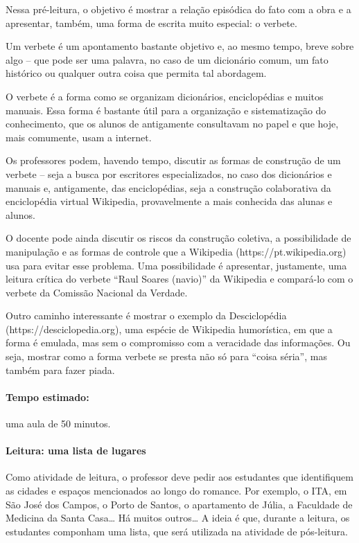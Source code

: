 \documentclass[12pt]{extarticle}
\begin{document}
Nessa pré-leitura, o objetivo é mostrar a relação episódica do fato com
a obra e a apresentar, também, uma forma de escrita muito especial: o
verbete.

Um verbete é um apontamento bastante objetivo e, ao mesmo tempo, breve
sobre algo -- que pode ser uma palavra, no caso de um dicionário comum,
um fato histórico ou qualquer outra coisa que permita tal abordagem.

O verbete é a forma como se organizam dicionários, enciclopédias e
muitos manuais. Essa forma é bastante útil para a organização e
sistematização do conhecimento, que os alunos de antigamente consultavam
no papel e que hoje, mais comumente, usam a internet.

Os professores podem, havendo tempo, discutir as formas de construção de
um verbete -- seja a busca por escritores especializados, no caso dos
dicionários e manuais e, antigamente, das enciclopédias, seja a
construção colaborativa da enciclopédia virtual Wikipedia, provavelmente
a mais conhecida das alunas e alunos.

O docente pode ainda discutir os riscos da construção coletiva, a
possibilidade de manipulação e as formas de controle que a Wikipedia
(https://pt.wikipedia.org) usa para evitar esse problema. Uma
possibilidade é apresentar, justamente, uma leitura crítica do verbete
``Raul Soares (navio)'' da Wikipedia e compará-lo com o verbete da
Comissão Nacional da Verdade.

Outro caminho interessante é mostrar o exemplo da Desciclopédia
(https://desciclopedia.org), uma espécie de Wikipedia humorística, em
que a forma é emulada, mas sem o compromisso com a veracidade das
informações. Ou seja, mostrar como a forma verbete se presta não só para
``coisa séria'', mas também para fazer piada.

\paragraph{Tempo estimado:} uma aula de 50 minutos.

\paragraph{Leitura: uma lista de lugares}

Como atividade de leitura, o professor deve pedir aos estudantes que
identifiquem as cidades e espaços mencionados ao longo do romance. Por
exemplo, o ITA, em São José dos Campos, o Porto de Santos, o apartamento
de Júlia, a Faculdade de Medicina da Santa Casa\ldots{} Há muitos
outros\ldots{} A ideia é que, durante a leitura, os estudantes componham
uma lista, que será utilizada na atividade de pós-leitura.
\end{document}
